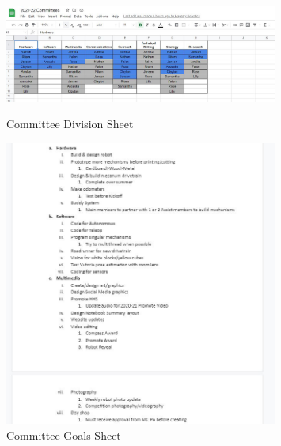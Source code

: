 \begin{figure}[ht]
\centering
\begin{minipage}[b]{.50\textwidth}
	\centering
	\includegraphics[width=0.8\textwidth, angle=0]{Meetings/August/08-10-21/8-10-21_Image2 - Nathan Forrer.JPG}
	\caption{Committee Division Sheet}
	\label{fig:pic2}
\end{minipage}%
\hfill%
\begin{minipage}[b]{.50\textwidth}
	\centering
	\includegraphics[width=0.8\textwidth, angle=0]{Meetings/August/08-10-21/8-10-21_Image3 - Nathan Forrer.JPG}
	\caption{Committee Goals Sheet}
	\label{fig:pic3}
\end{minipage}
\end{figure}

